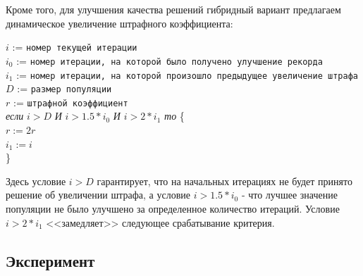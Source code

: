 \documentclass{llncs}
\begin{document}
Кроме того, для улучшения качества решений гибридный вариант предлагаем динамическое увеличение штрафного коэффициента:

\begin{flushleft}
\small

$i$ := \verb"номер текущей итерации" \\
$i_0$ := \verb"номер итерации, на которой было получено улучшение рекорда"\\
$i_1$ := \verb"номер итерации, на которой произошло предыдущее увеличение штрафа"\\
$D$ := \verb"размер популяции"\\
$r$ := \verb"штрафной коэффициент"\\

\textit{если} $i > D$ \textit{И} $i > 1.5 * i_0$ \textit{И} $i > 2 * i_1$  \textit{то} \{\\
\leftskip=12pt
    $r := 2r$\\
    $i_1 := i$\\
    \leftskip=0pt
\}
\end{flushleft}

Здесь условие $i > D$ гарантирует, что на начальных итерациях не будет принято решение об увеличении штрафа, а условие $i > 1.5 * i_0$ - что лучшее значение популяции не было улучшено за определенное количество итераций. Условие $i > 2 * i_1$ <<замедляет>> следующее срабатывание критерия.

\subsection{Эксперимент}\label{sec:exp:de}
\end{document}
